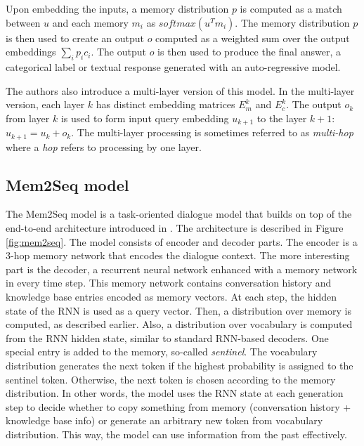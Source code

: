 Upon embedding the inputs, a memory distribution $p$ is computed as a match between $u$ and each memory $m_i$ as $softmax (u^Tm_i)$.
The memory distribution $p$ is then used to create an output $o$ computed as a weighted sum over the output embeddings $\sum_i p_ic_i$.
The output $o$ is then used to produce the final answer, a categorical label or textual response generated with an auto-regressive model.

The authors also introduce a multi-layer version of this model.
In the multi-layer version, each layer $k$ has distinct embedding matrices $E^k_m$ and $E^k_c$. The output $o_k$ from layer $k$ is used to form input query embedding $u_{k+1}$ to the layer $k+1$: $u_{k+1} = u_k + o_k$.
The multi-layer processing is sometimes referred to as \emph{multi-hop} where a \emph{hop} refers to processing by one layer.

\subsection{Mem2Seq model}
\label{02:sec:mem2seq}
The Mem2Seq model \cite{madotto-etal-2018-mem2seq} is a task-oriented dialogue model that builds on top of the end-to-end architecture introduced in \citet{sukhbaatar2015end}.
The architecture is described in Figure \ref{fig:mem2seq}.
The model consists of encoder and decoder parts.
The encoder is a 3-hop memory network that encodes the dialogue context.
The more interesting part is the decoder, a recurrent neural network enhanced with a memory network in every time step.
This memory network contains conversation history and knowledge base entries encoded as memory vectors.
At each step, the hidden state of the RNN is used as a query vector. Then, a distribution over memory is computed, as described earlier. 
Also, a distribution over vocabulary is computed from the RNN hidden state, similar to standard RNN-based decoders.
One special entry is added to the memory, so-called \emph{sentinel}.
The vocabulary distribution generates the next token if the highest probability is assigned to the sentinel token.
Otherwise, the next token is chosen according to the memory distribution.
In other words, the model uses the RNN state at each generation step to decide whether to copy something from memory (conversation history + knowledge base info) or generate an arbitrary new token from vocabulary distribution.
This way, the model can use information from the past effectively.

